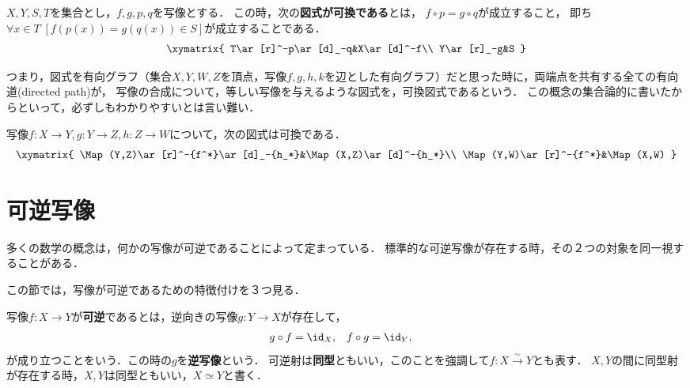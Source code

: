 \documentclass[uplatex,dvipdfmx]{jsreport}
\begin{document}
\begin{definition}[写像の可換図式]
    $X,Y,S,T$を集合とし，$f,g,p,q$を写像とする．
    この時，次の\textbf{図式が可換である}とは，
    $f\circ p=g\circ q$が成立すること，
    即ち$\forall x\in T \; [f(p(x))=g(q(x)) \in S]$が成立することである．
    \[
        \xymatrix{
        T\ar[r]^-p\ar[d]_-q&X\ar[d]^-f\\
        Y\ar[r]_-g&S
        }
    \]
\end{definition}
\begin{remark}
    つまり，図式を有向グラフ（集合$X,Y,W,Z$を頂点，写像$f,g,h,k$を辺とした有向グラフ）だと思った時に，両端点を共有する全ての有向道(directed path)が，
    写像の合成について，等しい写像を与えるような図式を，可換図式であるという．
    この概念の集合論的に書いたからといって，必ずしもわかりやすいとは言い難い．
\end{remark}

\begin{proposition}[写像の合成の結合性]\label{prop-associativity-of-mapping}
    写像$f:X\to Y,g:Y\to Z,h:Z\to W$について，次の図式は可換である．
    \[\xymatrix{
        \Map(Y,Z)\ar[r]^-{f^*}\ar[d]_-{h_*}&\Map(X,Z)\ar[d]^-{h_*}\\
        \Map(Y,W)\ar[r]^-{f^*}&\Map(X,W)
    }\]
\end{proposition}

\section{可逆写像}

\begin{screen}
    多くの数学の概念は，何かの写像が可逆であることによって定まっている．
    標準的な可逆写像が存在する時，その２つの対象を同一視することがある．

    この節では，写像が可逆であるための特徴付けを３つ見る．
\end{screen}

\begin{definition}[invertible]
    写像$f:X\to Y$が\textbf{可逆}であるとは，逆向きの写像$g:Y\to X$が存在して，
    \begin{align*}
        g\circ f&=\id_X,&f\circ g&=\id_Y,
    \end{align*}
    が成り立つことをいう．この時の$g$を\textbf{逆写像}という．
    可逆射は\textbf{同型}ともいい，このことを強調して$f:X\xrightarrow{\sim}Y$とも表す．
    $X,Y$の間に同型射が存在する時，$X,Y$は同型ともいい，$X\simeq Y$と書く．
\end{definition}
\end{document}
